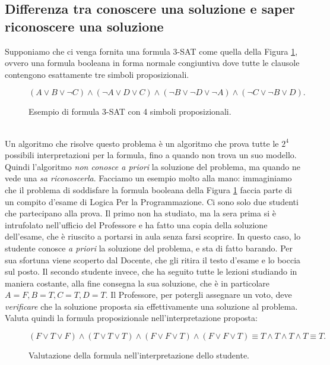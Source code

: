 \documentclass{book}
\theoremstyle{definition}
\theoremstyle{definition}
\theoremstyle{definition}
\theoremstyle{plain}
\theoremstyle{plain}
\theoremstyle{plain}
\theoremstyle{plain}
\begin{document}
\subsection{Differenza tra conoscere una soluzione e saper riconoscere una soluzione}
Supponiamo che ci venga fornita una formula 3-SAT come quella della Figura \ref{fig:3_sat_example}, ovvero una formula booleana in forma normale congiuntiva dove tutte le clausole contengono esattamente tre simboli proposizionali.
\begin{figure}[!htb]
\captionsetup{font=scriptsize}
\begin{displaymath}
(A \lor B \lor \lnot C) \land (\lnot A \lor D \lor C) \land (\lnot B \lor \lnot D \lor \lnot A) \land (\lnot C \lor \lnot B \lor D).
\end{displaymath}
\caption{\scriptsize Esempio di formula 3-SAT con 4 simboli proposizionali.}\label{fig:3_sat_example}
\end{figure}\\
Un algoritmo che risolve questo problema è un algoritmo che prova tutte le $2^4$ possibili interpretazioni per la formula, fino a quando non trova un suo modello. Quindi l'algoritmo \emph{non conosce a priori} la soluzione del problema, ma quando ne vede una \emph{sa riconoscerla}. Facciamo un esempio molto alla mano: immaginiamo che il problema di soddisfare la formula booleana della Figura \ref{fig:3_sat_example} faccia parte di un compito d'esame di Logica Per la Programmazione. Ci sono solo due studenti che partecipano alla prova. Il primo non ha studiato, ma la sera prima si è intrufolato nell'ufficio del Professore e ha fatto una copia della soluzione dell'esame, che è riuscito a portarsi in aula senza farsi scoprire. In questo caso, lo studente conosce \emph{a priori} la soluzione del problema, e sta di fatto barando. Per sua sfortuna viene scoperto dal Docente, che gli ritira il testo d'esame e lo boccia sul posto. Il secondo studente invece, %
che ha seguito tutte le lezioni studiando in maniera costante, alla fine consegna la sua soluzione, che è in particolare $A=F, B=T, C=T, D=T $. Il Professore, per potergli assegnare un voto, deve \emph{verificare} che la soluzione proposta sia effettivamente una soluzione al problema. Valuta quindi la formula proposizionale nell'interpretazione proposta:
\begin{figure}[!htb]
\captionsetup{font=scriptsize}
\begin{displaymath}
(F \lor T \lor F) \land (T \lor T \lor T) \land (F \lor F \lor T) \land (F \lor F \lor T) \equiv T \land T \land T \land T \equiv T.
\end{displaymath}
\caption{\scriptsize Valutazione della formula nell'interpretazione dello studente.}\label{fig:3_sat_correction}
\end{figure}\\
\end{document}
